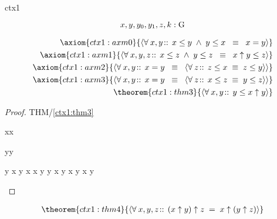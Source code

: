 \documentclass[12pt]{amsart}
\begin{document}
\begin{context}{ctx1}


\[ x,y,y_0,y_1,z,k: \text{G} \]

\precedence{[[\uparrow],[\le]]}
\begin{align}
\axiom{ctx1:axm0}{ 
	\qforall{x,y}{}{ x \le y \1\land y \le x \2\equiv x = y } } 
\\ \axiom{ctx1:axm1}{ 
	\qforall{x,y,z}{}{ x \le z \1\land y \le z \2\equiv 
		x \uparrow y \le z } }
\\ \axiom{ctx1:axm2}{ 
	\qforall{x,y}{}{ x = y \2\equiv \qforall{z}{}{ z \le x \1\equiv z \le y } } }
\\ \axiom{ctx1:axm3}{ 
	\qforall{x,y}{}{ x = y \2\equiv \qforall{z}{}{ x \le z \1\equiv y \le z } } }
\\ \theorem{ctx1:thm3}{ \qforall{x,y}{}{ y \le x \uparrow y } }
\end{align}

\begin{proof}{THM/\ref{ctx1:thm3}}
	\begin{free:var}{x}{x}
	\begin{free:var}{y}{y}
\begin{calculation}
		y \le x \uparrow y
		x \le x \uparrow y
	\2\land	y \le x \uparrow y
	\hint{=}{ \eqref{ctx1:axm1} }
		x \uparrow y \1\le x \uparrow y
	\hint{=}{ \eqref{ctx1:axm0} }
		\true
\end{calculation}
	\end{free:var}
	\end{free:var}
\end{proof}

\begin{align}
\theorem{ctx1:thm4}{ \qforall{x,y,z}{}{ (x \uparrow y) \uparrow z \1= x \uparrow (y \uparrow z) } }
\end{align}


\end{context}
\end{document}
